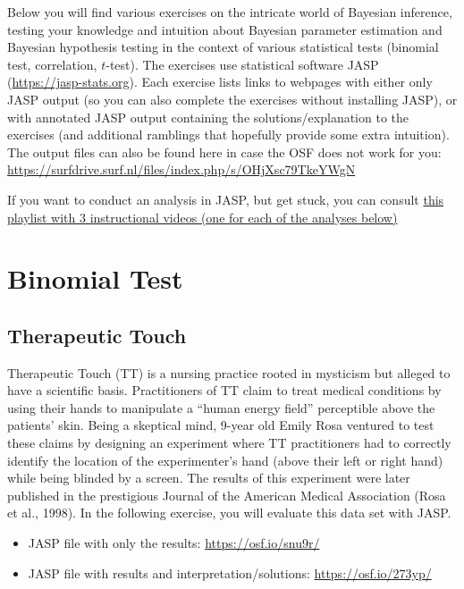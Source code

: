 \documentclass[
]{book}
\providecommand{\tightlist}{%
  \setlength{\itemsep}{0pt}\setlength{\parskip}{0pt}}
\begin{document}
Below you will find various exercises on the intricate world of Bayesian inference, testing your knowledge and intuition about Bayesian parameter estimation and Bayesian hypothesis testing in the context of various statistical tests (binomial test, correlation, \(t\)-test). The exercises use statistical software JASP (\url{https://jasp-stats.org}). Each exercise lists links to webpages with either only JASP output (so you can also complete the exercises without installing JASP), or with annotated JASP output containing the solutions/explanation to the exercises (and additional ramblings that hopefully provide some extra intuition). The output files can also be found here in case the OSF does not work for you: \url{https://surfdrive.surf.nl/files/index.php/s/OHjXsc79TkeYWgN}

If you want to conduct an analysis in JASP, but get stuck, you can consult \href{https://youtube.com/playlist?list=PLWPa8RxHarcOyxhMAk_RMT9h_GYHCrgGQ}{this playlist with 3 instructional videos (one for each of the analyses below)}

\hypertarget{binomial-test}{%
\section{Binomial Test}\label{binomial-test}}

\hypertarget{therapeutic-touch}{%
\subsection{Therapeutic Touch}\label{therapeutic-touch}}

Therapeutic Touch (TT) is a nursing practice rooted in mysticism but alleged to have a scientific basis. Practitioners of TT claim to treat medical conditions by using their hands to manipulate a ``human energy field'' perceptible above the patients' skin. Being a skeptical mind, 9-year old Emily Rosa ventured to test these claims by designing an experiment where TT practitioners had to correctly identify the location of the experimenter's hand (above their left or right hand) while being blinded by a screen. The results of this experiment were later published in the prestigious Journal of the American Medical Association (Rosa et al., 1998). In the following exercise, you will evaluate this data set with JASP.

\begin{itemize}
\tightlist
\item
  JASP file with only the results: \url{https://osf.io/snu9r/}
\item
  JASP file with results and interpretation/solutions: \url{https://osf.io/273yp/}
\end{itemize}
\end{document}

